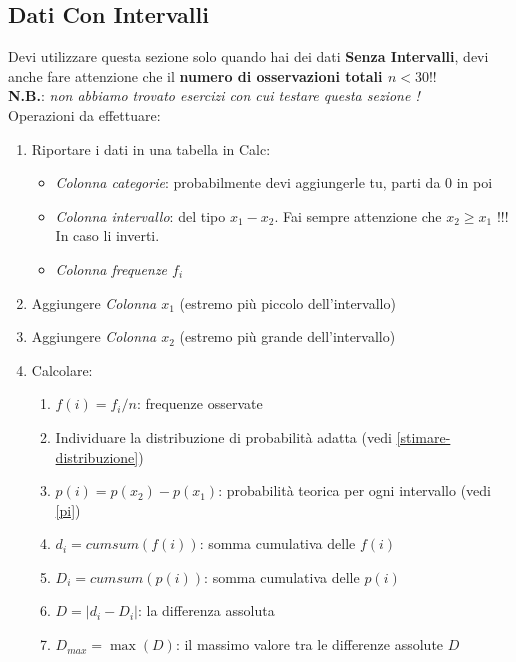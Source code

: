 \subsection{Dati Con Intervalli}

Devi utilizzare questa sezione solo quando hai dei dati \textbf{Senza
    Intervalli}, devi anche fare attenzione che il \textbf{numero di
    osservazioni totali $n < 30$}!!\\

\textbf{N.B.}: \textit{non abbiamo trovato esercizi con cui testare questa
    sezione !}\\

Operazioni da effettuare:

\begin{enumerate}
    \item Riportare i dati in una tabella in Calc:
          \begin{itemize}
              \item \textit{Colonna categorie}: probabilmente devi aggiungerle
                    tu, parti da 0 in poi
              \item \textit{Colonna intervallo}: del tipo $x_1 - x_2$. Fai
                    sempre attenzione che $x_2 \ge x_1$ !!! In caso li inverti.
              \item \textit{Colonna frequenze $f_i$}
          \end{itemize}
    \item Aggiungere \textit{Colonna $x_1$} (estremo più piccolo
          dell'intervallo)
    \item Aggiungere \textit{Colonna $x_2$} (estremo più grande dell'intervallo)
    \item Calcolare:
          \begin{enumerate}
              \item $f(i) = f_i / n$: frequenze osservate
              \item Individuare la distribuzione di probabilità adatta (vedi
                    \ref{stimare-distribuzione})
              \item $p(i) = p(x_2) - p(x_1)$: probabilità teorica per ogni
                    intervallo (vedi \ref{pi})
              \item $d_i = cumsum(f(i))$: somma cumulativa delle $f(i)$
              \item $D_i = cumsum(p(i))$: somma cumulativa delle $p(i)$
              \item $D = |d_i - D_i|$: la differenza assoluta
              \item $D_{max} = \max(D)$: il massimo valore tra le differenze
                    assolute $D$
          \end{enumerate}
\end{enumerate}

